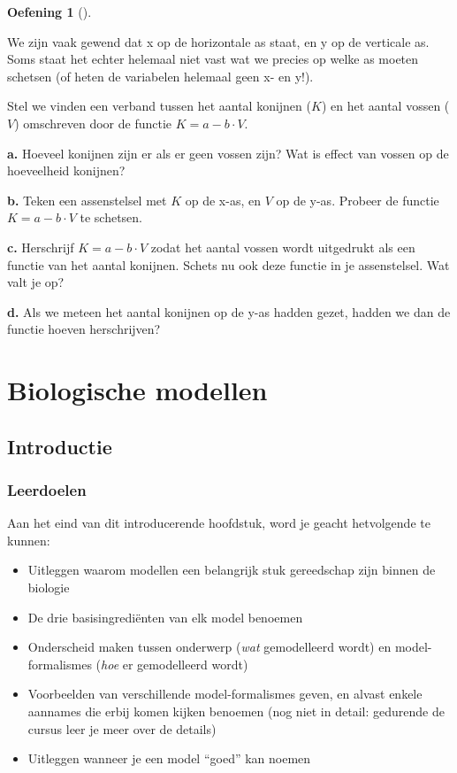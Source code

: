 \documentclass[
  a4paper,
]{scrbook}
\providecommand{\tightlist}{%
  \setlength{\itemsep}{0pt}\setlength{\parskip}{0pt}}\usepackage{longtable,booktabs,array}
\theoremstyle{definition}
\newtheorem{exercise}{Oefening}[chapter]
\theoremstyle{remark}
\begin{document}
\begin{exercise}[]\protect\hypertarget{exr-draw-2}{}\label{exr-draw-2}

We zijn vaak gewend dat x op de horizontale as staat, en y op de
verticale as. Soms staat het echter helemaal niet vast wat we precies op
welke as moeten schetsen (of heten de variabelen helemaal geen x- en
y!).

Stel we vinden een verband tussen het aantal konijnen (\(K\)) en het
aantal vossen (\(V\)) omschreven door de functie \(K = a - b \cdot V\).

\textbf{a.} Hoeveel konijnen zijn er als er geen vossen zijn? Wat is
effect van vossen op de hoeveelheid konijnen?

\textbf{b.} Teken een assenstelsel met \(K\) op de x-as, en \(V\) op de
y-as. Probeer de functie \(K = a - b \cdot V\) te schetsen.

\textbf{c.} Herschrijf \(K = a - b \cdot V\) zodat het aantal vossen
wordt uitgedrukt als een functie van het aantal konijnen. Schets nu ook
deze functie in je assenstelsel. Wat valt je op?

\textbf{d.} Als we meteen het aantal konijnen op de y-as hadden gezet,
hadden we dan de functie hoeven herschrijven?

\end{exercise}

\part{Biologische modellen}

\hypertarget{sec-tbintro}{%
\chapter{Introductie}\label{sec-tbintro}}

\hypertarget{leerdoelen}{%
\section{Leerdoelen}\label{leerdoelen}}

Aan het eind van dit introducerende hoofdstuk, word je geacht
hetvolgende te kunnen:

\begin{itemize}
\tightlist
\item
  Uitleggen waarom modellen een belangrijk stuk gereedschap zijn binnen
  de biologie
\item
  De drie basisingrediënten van elk model benoemen
\item
  Onderscheid maken tussen onderwerp (\emph{wat} gemodelleerd wordt) en
  model-formalismes (\emph{hoe} er gemodelleerd wordt)
\item
  Voorbeelden van verschillende model-formalismes geven, en alvast
  enkele aannames die erbij komen kijken benoemen (nog niet in detail:
  gedurende de cursus leer je meer over de details)
\item
  Uitleggen wanneer je een model ``goed'' kan noemen
\end{itemize}
\end{document}
